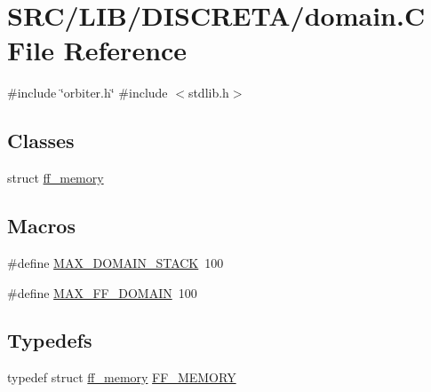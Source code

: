 \hypertarget{domain_8_c}{}\section{S\+R\+C/\+L\+I\+B/\+D\+I\+S\+C\+R\+E\+T\+A/domain.C File Reference}
\label{domain_8_c}
{\ttfamily \#include \char`\"{}orbiter.\+h\char`\"{}}\newline
{\ttfamily \#include $<$stdlib.\+h$>$}\newline
\subsection*{Classes}
\begin{DoxyCompactItemize}
\item 
struct \mbox{\hyperlink{structff__memory}{ff\+\_\+memory}}
\end{DoxyCompactItemize}
\subsection*{Macros}
\begin{DoxyCompactItemize}
\item 
\#define \mbox{\hyperlink{domain_8_c_ab6352cd9d408f93a8719644a940c2fad}{M\+A\+X\+\_\+\+D\+O\+M\+A\+I\+N\+\_\+\+S\+T\+A\+CK}}~100
\item 
\#define \mbox{\hyperlink{domain_8_c_a4c97cb6c34f32b8051b52d311793947e}{M\+A\+X\+\_\+\+F\+F\+\_\+\+D\+O\+M\+A\+IN}}~100
\end{DoxyCompactItemize}
\subsection*{Typedefs}
\begin{DoxyCompactItemize}
\item 
typedef struct \mbox{\hyperlink{structff__memory}{ff\+\_\+memory}} \mbox{\hyperlink{domain_8_c_ae22defe03d5003bc348665e611a94aa9}{F\+F\+\_\+\+M\+E\+M\+O\+RY}}
\end{DoxyCompactItemize}
